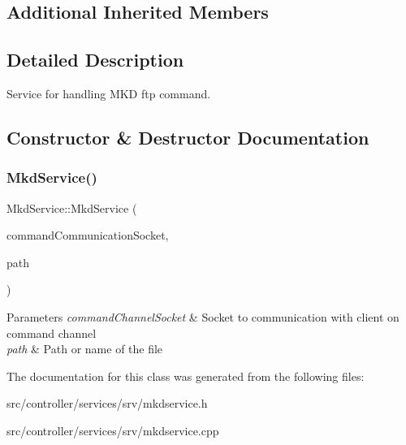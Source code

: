 \subsection*{Additional Inherited Members}


\subsection{Detailed Description}
Service for handling M\+KD ftp command. 

\subsection{Constructor \& Destructor Documentation}
\mbox{\label{classMkdService_a3651f694017141915da3d946c98bd33d}} 
\subsubsection{\texorpdfstring{Mkd\+Service()}{MkdService()}}
{\footnotesize\ttfamily Mkd\+Service\+::\+Mkd\+Service (\begin{DoxyParamCaption}\item[{int}]{command\+Communication\+Socket,  }\item[{const Q\+String \&}]{path }\end{DoxyParamCaption})}


\begin{DoxyParams}{Parameters}
{\em command\+Channel\+Socket} & Socket to communication with client on command channel \\
\hline
{\em path} & Path or name of the file \\
\hline
\end{DoxyParams}


The documentation for this class was generated from the following files\+:\begin{DoxyCompactItemize}
\item 
src/controller/services/srv/mkdservice.\+h\item 
src/controller/services/srv/mkdservice.\+cpp\end{DoxyCompactItemize}
